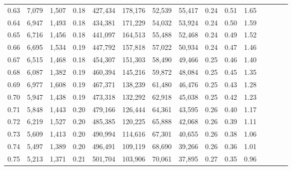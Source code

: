 \begin{tabular}{rrrcrrrrrrrrrrr}
0.63 &   7,079 &  1,507 &                                       0.18 &  427,434 &  178,176 &   52,539 &   55,417 &  0.24 &  0.51 &                         1.65 \\
0.64 &   6,947 &  1,493 &                                       0.18 &  434,381 &  171,229 &   54,032 &   53,924 &  0.24 &  0.50 &                         1.59 \\
0.65 &   6,716 &  1,456 &                                       0.18 &  441,097 &  164,513 &   55,488 &   52,468 &  0.24 &  0.49 &                         1.52 \\
0.66 &   6,695 &  1,534 &                                       0.19 &  447,792 &  157,818 &   57,022 &   50,934 &  0.24 &  0.47 &                         1.46 \\
0.67 &   6,515 &  1,468 &                                       0.18 &  454,307 &  151,303 &   58,490 &   49,466 &  0.25 &  0.46 &                         1.40 \\
0.68 &   6,087 &  1,382 &                                       0.19 &  460,394 &  145,216 &   59,872 &   48,084 &  0.25 &  0.45 &                         1.35 \\
0.69 &   6,977 &  1,608 &                                       0.19 &  467,371 &  138,239 &   61,480 &   46,476 &  0.25 &  0.43 &                         1.28 \\
0.70 &   5,947 &  1,438 &                                       0.19 &  473,318 &  132,292 &   62,918 &   45,038 &  0.25 &  0.42 &                         1.23 \\
0.71 &   5,848 &  1,443 &                                       0.20 &  479,166 &  126,444 &   64,361 &   43,595 &  0.26 &  0.40 &                         1.17 \\
0.72 &   6,219 &  1,527 &                                       0.20 &  485,385 &  120,225 &   65,888 &   42,068 &  0.26 &  0.39 &                         1.11 \\
0.73 &   5,609 &  1,413 &                                       0.20 &  490,994 &  114,616 &   67,301 &   40,655 &  0.26 &  0.38 &                         1.06 \\
0.74 &   5,497 &  1,389 &                                       0.20 &  496,491 &  109,119 &   68,690 &   39,266 &  0.26 &  0.36 &                         1.01 \\
0.75 &   5,213 &  1,371 &                                       0.21 &  501,704 &  103,906 &   70,061 &   37,895 &  0.27 &  0.35 &                         0.96 \\

\end{tabular}
